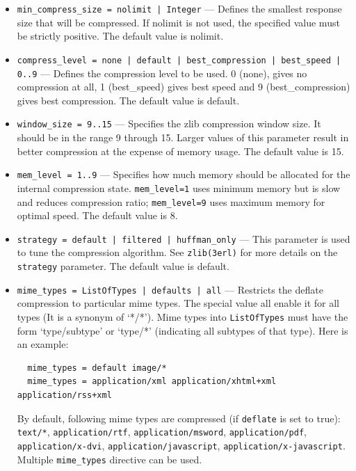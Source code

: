 \documentclass[11pt,oneside,english]{book}
\begin{document}
\begin{itemize}
             \begin{itemize}
             \item \verb+min_compress_size = nolimit | Integer+ --- Defines the
               smallest response size that will be compressed. If nolimit is not
               used, the specified value must be strictly positive. The default
               value is nolimit.

             \item \verb+compress_level = none | default | best_compression | best_speed | 0..9+ ---
               Defines the compression level to be used. 0 (none), gives no
               compression at all, 1 (best\_speed) gives best speed and 9
               (best\_compression) gives best compression. The default value is
               default.

             \item \verb+window_size = 9..15+ --- Specifies the zlib compression
               window size. It should be in the range 9 through 15. Larger
               values of this parameter result in better compression at the
               expense of memory usage. The default value is 15.

             \item \verb+mem_level = 1..9+ --- Specifies how much memory should
               be allocated for the internal compression
               state. \verb+mem_level=1+ uses minimum memory but is slow and
               reduces compression ratio; \verb+mem_level=9+ uses maximum memory
               for optimal speed. The default value is 8.

             \item \verb+strategy = default | filtered | huffman_only+ --- This
               parameter is used to tune the compression algorithm. See
               \verb+zlib(3erl)+ for more details on the \verb+strategy+
               parameter. The default value is default.

             \item \verb+mime_types = ListOfTypes | defaults | all+ ---
               Restricts the deflate compression to particular mime types. The
               special value all enable it for all types (It is a synonym of
               `*/*'). Mime types into \verb+ListOfTypes+ must have the form
               `type/subtype' or `type/*' (indicating all subtypes of that
               type). Here is an example:
\begin{verbatim}
  mime_types = default image/*
  mime_types = application/xml application/xhtml+xml application/rss+xml
\end{verbatim}
                    By default, following mime types are compressed (if
                    \verb+deflate+ is set to true): \verb+text/*+,
                    \verb+application/rtf+, \verb+application/msword+,
                    \verb+application/pdf+, \verb+application/x-dvi+,
                    \verb+application/javascript+,
                    \verb+application/x-javascript+. Multiple \verb+mime_types+
                    directive can be used.
             \end{itemize}


\end{itemize}
\end{document}
